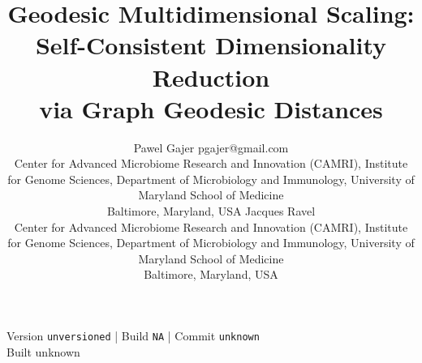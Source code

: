 \documentclass[twoside,11pt]{article}
\providecommand{\manuscriptversion}{unversioned}
\providecommand{\manuscriptbuildnumber}{NA}
\providecommand{\manuscriptcommit}{unknown}
\providecommand{\manuscriptbuilddatetime}{unknown}
\begin{document}
\title{Geodesic Multidimensional Scaling:\\
       Self-Consistent Dimensionality Reduction\\ via Graph Geodesic Distances}

\author{\name Pawel Gajer \email pgajer@gmail.com \\
        \addr Center for Advanced Microbiome Research and Innovation (CAMRI), Institute for Genome Sciences, Department of Microbiology and Immunology, University of Maryland School of Medicine \\
        Baltimore, Maryland, USA
        \AND
        \name Jacques Ravel \\
        \addr Center for Advanced Microbiome Research and Innovation (CAMRI), Institute for Genome Sciences, Department of Microbiology and Immunology, University of Maryland School of Medicine \\
        Baltimore, Maryland, USA}


\maketitle
\begin{center}
\footnotesize
Version \texttt{\manuscriptversion} \quad | \quad Build
\texttt{\manuscriptbuildnumber} \quad | \quad Commit
\texttt{\manuscriptcommit}\\
Built \manuscriptbuilddatetime
\end{center}
\vspace{0.35em}
\end{document}
